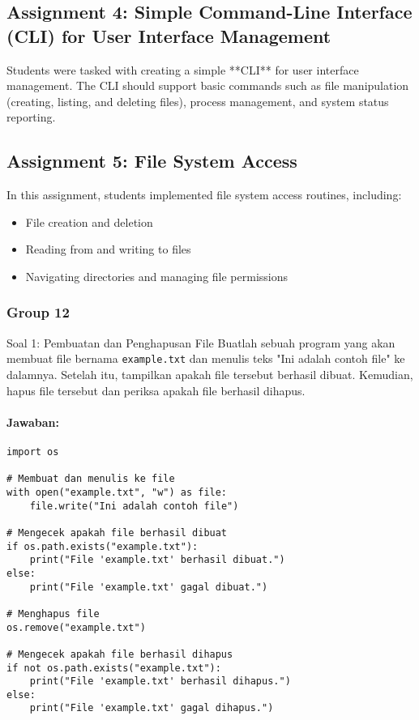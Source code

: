 \documentclass[12pt]{article}
\begin{document}
\subsection{Assignment 4: Simple Command-Line Interface (CLI) for User Interface Management}
Students were tasked with creating a simple **CLI** for user interface management. The CLI should support basic commands such as file manipulation (creating, listing, and deleting files), process management, and system status reporting.

\subsection{Assignment 5: File System Access}
In this assignment, students implemented file system access routines, including:
\begin{itemize}
    \item File creation and deletion
    \item Reading from and writing to files
    \item Navigating directories and managing file permissions
\end{itemize}

\subsubsection{Group 12}
{Soal 1: Pembuatan dan Penghapusan File}
Buatlah sebuah program yang akan membuat file bernama \texttt{example.txt} dan menulis teks "Ini adalah contoh file" ke dalamnya. Setelah itu, tampilkan apakah file tersebut berhasil dibuat. Kemudian, hapus file tersebut dan periksa apakah file berhasil dihapus.

\paragraph{Jawaban:}
\begin{verbatim}
import os

# Membuat dan menulis ke file
with open("example.txt", "w") as file:
    file.write("Ini adalah contoh file")

# Mengecek apakah file berhasil dibuat
if os.path.exists("example.txt"):
    print("File 'example.txt' berhasil dibuat.")
else:
    print("File 'example.txt' gagal dibuat.")

# Menghapus file
os.remove("example.txt")

# Mengecek apakah file berhasil dihapus
if not os.path.exists("example.txt"):
    print("File 'example.txt' berhasil dihapus.")
else:
    print("File 'example.txt' gagal dihapus.")
\end{verbatim}
\end{document}

